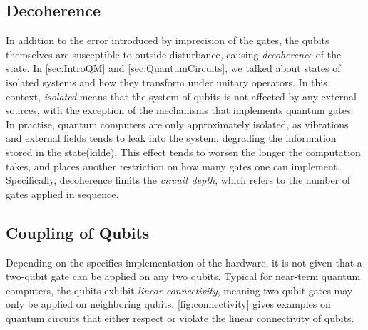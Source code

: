 \subsection{Decoherence}\label{sec:DaEC}
In addition to the error introduced by imprecision of the gates, the qubits themselves are susceptible to outside disturbance, causing \emph{decoherence} of the state. In \autoref{sec:IntroQM} and \autoref{sec:QuantumCircuits}, we talked about states of isolated systems and how they transform under unitary operators. In this context, \emph{isolated} means that the system of qubits is not affected by any external sources, with the exception of the mechanisms that implements quantum gates. In practise, quantum computers are only approximately isolated, as vibrations and external fields tends to leak into the system, degrading the information stored in the state(kilde). This effect tends to worsen the longer the computation takes, and places another restriction on how many gates one can implement. Specifically, decoherence limits the \emph{circuit depth}, which refers to the number of gates applied in sequence. 

\subsection{Coupling of Qubits}\label{sec:CoQ}
Depending on the specifics implementation of the hardware, it is not given that a two-qubit gate can be applied on any two qubits. Typical for near-term quantum computers, the qubits exhibit \emph{linear connectivity}, meaning two-qubit gates may only be applied on neighboring qubits. \autoref{fig:connectivity} gives examples on quantum circuits that either respect or violate the linear connectivity of qubits.     

